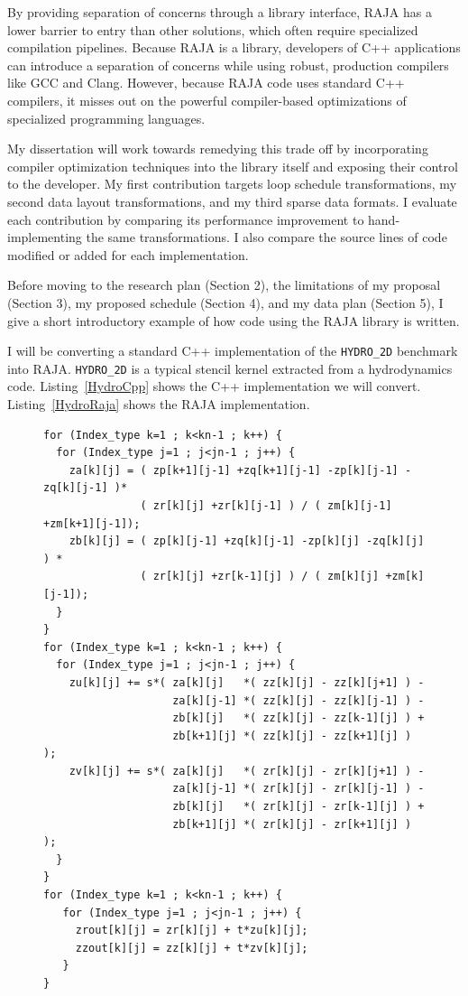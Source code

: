 \documentclass{article}
\begin{document}
By providing separation of concerns through a library interface, RAJA has a lower barrier to entry than other solutions, which often require specialized compilation pipelines. 
Because RAJA is a library, developers of C++ applications can introduce a separation of concerns while using robust, production compilers like GCC and Clang.
However, because RAJA code uses standard C++ compilers, it misses out on the powerful compiler-based optimizations of specialized programming languages.

My dissertation will work towards remedying this trade off by incorporating compiler optimization techniques into the library itself and exposing their control to the developer. 
My first contribution targets loop schedule transformations, my second data layout transformations, and my third sparse data formats.
I evaluate each contribution by comparing its performance improvement to hand-implementing the same transformations.
I also compare the source lines of code modified or added for each implementation.

Before moving to the research plan (Section 2), the limitations of my proposal (Section 3), my proposed schedule (Section 4), and my data plan (Section 5), I give a short introductory example of how code using the RAJA library is written.

I will be converting a standard C++ implementation of the \verb.HYDRO_2D. benchmark into RAJA. 
\verb.HYDRO_2D. is a typical stencil kernel extracted from a hydrodynamics code. 
Listing~\ref{HydroCpp} shows the C++ implementation we will convert.
Listing~\ref{HydroRaja} shows the RAJA implementation.


\begin{figure}
\begin{lstlisting}[caption={C++ implementation of the \texttt{HYDRO\_2D} benchmark},label={HydroCpp}]
for (Index_type k=1 ; k<kn-1 ; k++) {
  for (Index_type j=1 ; j<jn-1 ; j++) {
    za[k][j] = ( zp[k+1][j-1] +zq[k+1][j-1] -zp[k][j-1] -zq[k][j-1] )*
               ( zr[k][j] +zr[k][j-1] ) / ( zm[k][j-1] +zm[k+1][j-1]);
    zb[k][j] = ( zp[k][j-1] +zq[k][j-1] -zp[k][j] -zq[k][j] ) *
               ( zr[k][j] +zr[k-1][j] ) / ( zm[k][j] +zm[k][j-1]);
  }
}
for (Index_type k=1 ; k<kn-1 ; k++) {
  for (Index_type j=1 ; j<jn-1 ; j++) {
    zu[k][j] += s*( za[k][j]   *( zz[k][j] - zz[k][j+1] ) -
                    za[k][j-1] *( zz[k][j] - zz[k][j-1] ) -
                    zb[k][j]   *( zz[k][j] - zz[k-1][j] ) +
                    zb[k+1][j] *( zz[k][j] - zz[k+1][j] ) );
    zv[k][j] += s*( za[k][j]   *( zr[k][j] - zr[k][j+1] ) -
                    za[k][j-1] *( zr[k][j] - zr[k][j-1] ) -
                    zb[k][j]   *( zr[k][j] - zr[k-1][j] ) +
                    zb[k+1][j] *( zr[k][j] - zr[k+1][j] ) );
  }
}
for (Index_type k=1 ; k<kn-1 ; k++) {
   for (Index_type j=1 ; j<jn-1 ; j++) {
     zrout[k][j] = zr[k][j] + t*zu[k][j];
     zzout[k][j] = zz[k][j] + t*zv[k][j];
   }
}   
\end{lstlisting}
\end{figure}
\end{document}
